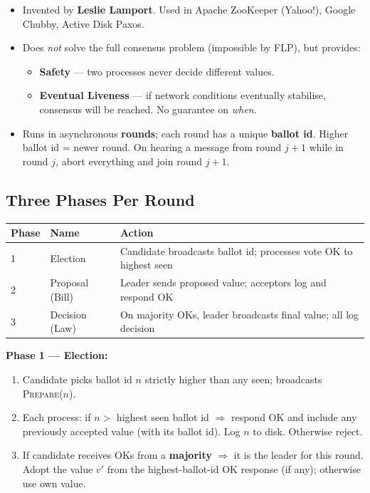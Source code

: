 \documentclass[12pt,a4paper]{article}
\begin{document}
\begin{itemize}[noitemsep]
  \item Invented by \textbf{Leslie Lamport}. Used in Apache ZooKeeper (Yahoo!), Google Chubby, Active Disk Paxos.
  \item Does \emph{not} solve the full consensus problem (impossible by FLP), but provides:
  \begin{itemize}[noitemsep]
    \item \textbf{Safety} --- two processes never decide different values.
    \item \textbf{Eventual Liveness} --- if network conditions eventually stabilise, consensus will be reached. No guarantee on \emph{when}.
  \end{itemize}
  \item Runs in asynchronous \textbf{rounds}; each round has a unique \textbf{ballot id}. Higher ballot id = newer round. On hearing a message from round $j{+}1$ while in round $j$, abort everything and join round $j{+}1$.
\end{itemize}

\subsection{Three Phases Per Round}

\begin{center}
\begin{tabular}{@{}lll@{}}
\toprule
Phase & Name & Action \\
\midrule
1 & Election & Candidate broadcasts ballot id; processes vote OK to highest seen \\
2 & Proposal (Bill) & Leader sends proposed value; acceptors log and respond OK \\
3 & Decision (Law) & On majority OKs, leader broadcasts final value; all log decision \\
\bottomrule
\end{tabular}
\end{center}

\textbf{Phase 1 --- Election:}
\begin{enumerate}[noitemsep]
  \item Candidate picks ballot id $n$ strictly higher than any seen; broadcasts \textsc{Prepare}($n$).
  \item Each process: if $n >$ highest seen ballot id $\Rightarrow$ respond OK and include any previously accepted value (with its ballot id). Log $n$ to disk. Otherwise reject.
  \item If candidate receives OKs from a \textbf{majority} $\Rightarrow$ it is the leader for this round. Adopt the value $v'$ from the highest-ballot-id OK response (if any); otherwise use own value.
\end{enumerate}
\end{document}

